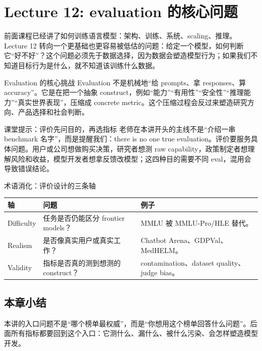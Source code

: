 \section{Lecture 12: evaluation 的核心问题}

前面课程已经讲了如何训练语言模型：架构、训练、系统、scaling、推理。Lecture 12 转向一个更基础也更容易被低估的问题：给定一个模型，如何判断它“好不好”？这个问题必须先于数据选择，因为数据会塑造模型行为；如果我们不知道目标行为是什么，就不知道该训练什么数据。

\begin{importantbox}{Evaluation 的核心挑战}
Evaluation 不是机械地“给 prompts、拿 responses、算 accuracy”。它是在把一个抽象 construct，例如“能力”“有用性”“安全性”“推理能力”“真实世界表现”，压缩成 concrete metric。这个压缩过程会反过来塑造研究方向、产品选择和社会判断。
\end{importantbox}

\begin{knowledgebox}{课堂提示：评价先问目的，再选指标}
老师在本讲开头的主线不是“介绍一串 benchmark 名字”，而是提醒我们：there is no one true evaluation。评价要服务具体问题。用户或公司想做购买决策，研究者想测 raw capability，政策制定者想理解风险和收益，模型开发者想拿反馈改模型；这四种目的需要不同 eval，混用会导致错误结论。
\end{knowledgebox}

\begin{knowledgebox}{术语消化：评价设计的三条轴}
\begin{tabular}{L{0.22\textwidth}L{0.34\textwidth}L{0.34\textwidth}}
\toprule
轴 & 问题 & 例子 \\
\midrule
Difficulty & 任务是否仍能区分 frontier models？ & MMLU 被 MMLU-Pro/HLE 替代。 \\
Realism & 是否像真实用户或真实工作？ & Chatbot Arena、GDPVal、MedHELM。 \\
Validity & 指标是否真的测到想测的 construct？ & contamination、dataset quality、judge bias。 \\
\bottomrule
\end{tabular}
\end{knowledgebox}

\subsection{本章小结}

本讲的入口问题不是“哪个榜单最权威”，而是“你想用这个榜单回答什么问题”。后面所有指标都要回到这个入口：它测什么、漏什么、被什么污染、会怎样塑造模型开发。

